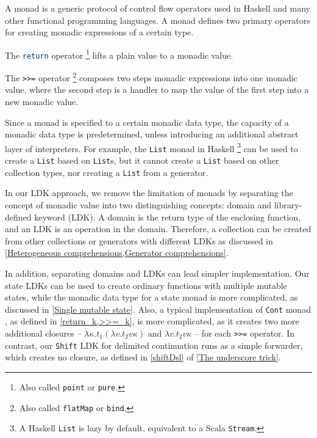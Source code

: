 A monad is a generic protocol of control flow operators used in Haskell and many other functional programming languages. A monad defines two primary operators for creating monadic expressions of a certain type.
\begin{enumerate*}
  \item The \lstinline[language=Haskell,deletekeywords={return}]{return} operator \footnote{Also called \lstinline{point} or \lstinline{pure}.} lifts a plain value to a monadic value.
  \item The \lstinline{>>=} operator \footnote{Also called \lstinline{flatMap} or \lstinline{bind}.} composes two steps monadic expressions into one monadic value, where the second step is a handler to map the value of the first step into a new monadic value.
\end{enumerate*}

Since a monad is specified to a certain monadic data type, the capacity of a monadic data type is predetermined, unless introducing an additional abstract layer of interpreters. For example, the \lstinline{List} monad in Haskell \footnote{A Haskell \lstinline{List} is lazy by default, equivalent to a Scala \lstinline{Stream}.} can be used to create a \lstinline{List} based on \lstinline{List}s, but it cannot create a \lstinline{List} based on other collection types, nor creating a \lstinline{List} from a generator.

In our LDK approach, we remove the limitation of monads by separating the concept of monadic value into two distinguishing concepts: domain and library-defined keyword (LDK). A domain is the return type of the enclosing function, and an LDK is an operation in the domain. Therefore, a collection can be created from other collections or generators with different LDKs as discussed in \cref{Heterogeneous comprehensions,Generator comprehensions}. 

In addition, separating domains and LDKs can lead simpler implementation. Our state LDKs can be used to create ordinary functions with multiple mutable states, while the monadic data type for a state monad is more complicated, as discussed in \cref{Single mutable state}. Also, a typical implementation of \lstinline{Cont} monad \cite{dyvbig2007monadic}, as defined in \cref{return_k,>>=_k}, is more complicated, as it creates two more additional closures -- $\lambda\kappa.t_1\left(\lambda v.t_2 v\kappa\right)$ and $\lambda v.t_2 v\kappa$ -- for each \lstinline{>>=} operator. In contrast, our \lstinline{Shift} LDK for delimited continuation runs as a simple forwarder, which creates no closure, as defined in \cref{shiftDsl} of \cref{The underscore trick}.

